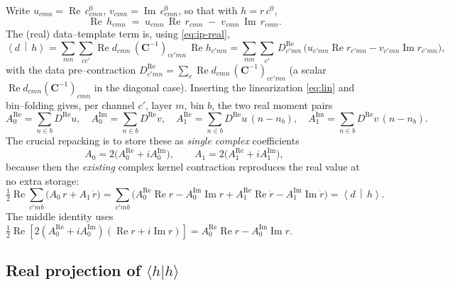 \documentclass[11pt]{article}
\newcommand{\re}{\operatorname{Re}}
\newcommand{\im}{\operatorname{Im}}
\newcommand{\ip}[2]{\left\langle #1 \,\middle|\, #2 \right\rangle}
\newcommand{\cc}{c'}
\newcommand{\invC}{(\bm{C}^{-1})}
\begin{document}
Write $u_{cmn}=\re\,c^0_{cmn}$, $v_{cmn}=\im\,c^0_{cmn}$, so that with
$h=r\,c^0$,
\begin{equation}
\re\,h_{cmn} \;=\; u_{cmn}\,\re\,r_{cmn} \;-\; v_{cmn}\,\im\,r_{cmn}.
\label{eq:Reh}
\end{equation}
The (real) data--template term is, using \eqref{eq:ip-real},
\begin{equation}
\ip{d}{h}
  = \sum_{mn}\sum_{c\cc}\re d_{cmn}\,\invC_{c\cc mn}\,\re h_{\cc mn}
  = \sum_{mn}\sum_{\cc}\, D^{\re}_{\cc mn}\,
    \big(u_{\cc mn}\re r_{\cc mn}-v_{\cc mn}\im r_{\cc mn}\big),
\end{equation}
with the data pre--contraction $D^{\re}_{\cc mn}=\sum_{c}\re d_{cmn}\,
\invC_{c\cc mn}$ (a scalar $\re d_{cmn}\invC_{cmn}$ in the diagonal case).
Inserting the linearization \eqref{eq:lin} and bin--folding gives, per channel
$\cc$, layer $m$, bin $b$, the two real moment pairs
\begin{equation}
A_0^{\re}=\!\!\sum_{n\in b}\! D^{\re}u,\quad
A_0^{\im}=\!\!\sum_{n\in b}\! D^{\re}v,\quad
A_1^{\re}=\!\!\sum_{n\in b}\! D^{\re}u\,(n-n_b),\quad
A_1^{\im}=\!\!\sum_{n\in b}\! D^{\re}v\,(n-n_b).
\end{equation}
The crucial repacking is to store these as \emph{single complex} coefficients
\begin{equation}
\boxed{\;A_0 = 2\big(A_0^{\re}+iA_0^{\im}\big),\qquad
        A_1 = 2\big(A_1^{\re}+iA_1^{\im}\big),\;}
\label{eq:A0repack}
\end{equation}
because then the \emph{existing} complex kernel contraction reproduces the real
value at no extra storage:
\begin{equation}
\tfrac12\re\!\sum_{\cc mb}\!\big(A_0\,r + A_1\,\dot r\big)
 = \sum_{\cc mb}\!\big(A_0^{\re}\re r - A_0^{\im}\im r
   + A_1^{\re}\re\dot r - A_1^{\im}\im\dot r\big)
 = \ip{d}{h}.
\label{eq:dh-final}
\end{equation}
The middle identity uses $\tfrac12\re[2(A_0^{\re}+iA_0^{\im})(\re r+i\im r)]
=A_0^{\re}\re r-A_0^{\im}\im r$.

\subsection{Real projection of $\langle h|h\rangle$}
\end{document}
